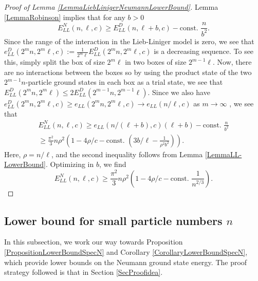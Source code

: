 \documentclass[a4paper,11pt]{article}
\numberwithin{equation}{section}
\begin{document}
	\begin{proof}[Proof of Lemma \ref{LemmaLiebLinigerNeumannLowerBound}]
		Lemma \ref{LemmaRobinson} implies that for any $ b>0 $ \begin{equation}
		E_{LL}^{N}(n,\ell,c)\geq E_{LL}^D(n,\ell+b,c)-\text{const. }\frac{n}{b^2}.
		\end{equation}
		Since the range of the interaction in the Lieb-Liniger model is zero, we see that $ e^D_{LL}(2^mn,2^m\ell,c):=\frac{1}{2^m\ell}E_{LL}^{D}(2^mn,2^m\ell,c) $ is a decreasing sequence. To see this, simply split the box of size $ 2^m\ell $ in two boxes of size $ 2^{m-1}\ell $. Now, there are no interactions between the boxes so by using the product state of the two $ 2^{m-1}n $-particle ground states in each box as a trial state, we see that $ E^D_{LL}(2^{m}n,2^m\ell)\leq 2E^D_{LL}(2^{m-1}n,2^{m-1}\ell)  $. Since we also have $ e^D_{LL}(2^mn,2^m\ell,c)\geq e_{LL}(2^mn,2^m\ell,c)\to e_{LL}(n/\ell,c) $ as $ m\to\infty $ \cite{lieb1963exact}, we see that \begin{equation}
		\begin{aligned}
		E_{LL}^{N}(n,\ell,c)\geq e_{LL}(n/(\ell+b),c)(\ell+b)-\text{const. }\frac{n}{b^2}\\\geq \frac{\pi^2}{3}n\rho^2\left(1-4\rho/c-\text{const. }\left(3b/\ell-\frac{1}{\rho^2b^2}\right)\right).
		\end{aligned}
		\end{equation}
		Here, $ \rho=n/\ell $, and the second inequality follows from Lemma \ref{LemmaLL-LowerBound}. Optimizing in $ b $, we find \begin{equation}
		E_{LL}^{N}(n,\ell,c)\geq \frac{\pi^2}{3}n\rho^2\left(1-4\rho/c-\text{const. }\frac{1}{n^{2/3}}\right).
		\end{equation}
	\end{proof}
	\subsection{Lower bound for small particle numbers $n$}
	\label{seclowsmalln}
	In this subsection, we work our way towards Proposition \ref{PropositionLowerBoundSpecN} and Corollary \ref{CorollaryLowerBoundSpecN}, which provide lower bounds on the Neumann ground state energy. The proof strategy followed is that in Section \ref{SecProofidea}.
	
\end{document}
